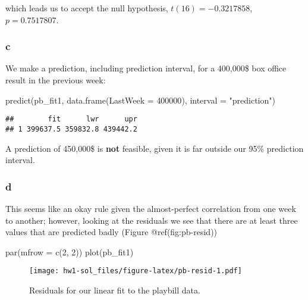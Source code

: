 \documentclass[
]{article}
\newenvironment{Shaded}{\begin{snugshade}}{\end{snugshade}}
\newcommand{\AttributeTok}[1]{\textcolor[rgb]{0.77,0.63,0.00}{#1}}
\newcommand{\DecValTok}[1]{\textcolor[rgb]{0.00,0.00,0.81}{#1}}
\newcommand{\FunctionTok}[1]{\textcolor[rgb]{0.00,0.00,0.00}{#1}}
\newcommand{\NormalTok}[1]{#1}
\newcommand{\StringTok}[1]{\textcolor[rgb]{0.31,0.60,0.02}{#1}}
\begin{document}
which leads us to accept the null hypothesis, \(t(16) = -0.3217858\),
\(p = 0.7517807\).

\hypertarget{c}{%
\subsubsection*{c}\label{c}}

We make a prediction, including prediction interval, for a 400,000\$ box
office result in the previous week:

\begin{Shaded}
\begin{Highlighting}[]
\FunctionTok{predict}\NormalTok{(pb\_fit1, }\FunctionTok{data.frame}\NormalTok{(}\AttributeTok{LastWeek =} \DecValTok{400000}\NormalTok{), }\AttributeTok{interval =} \StringTok{"prediction"}\NormalTok{)}
\end{Highlighting}
\end{Shaded}

\begin{verbatim}
##        fit      lwr      upr
## 1 399637.5 359832.8 439442.2
\end{verbatim}

A prediction of 450,000\$ is \textbf{not} feasible, given it is far
outside our 95\% prediction interval.

\hypertarget{d}{%
\subsubsection*{d}\label{d}}

This seems like an okay rule given the almost-perfect correlation from
one week to another; however, looking at the residuals we see that there
are at least three values that are predicted badly (Figure
@ref(fig:pb-resid))

\begin{Shaded}
\begin{Highlighting}[]
\FunctionTok{par}\NormalTok{(}\AttributeTok{mfrow =} \FunctionTok{c}\NormalTok{(}\DecValTok{2}\NormalTok{, }\DecValTok{2}\NormalTok{))}
\FunctionTok{plot}\NormalTok{(pb\_fit1)}
\end{Highlighting}
\end{Shaded}

\begin{figure}
\centering
\texttt{[image: hw1-sol\_files/figure-latex/pb-resid-1.pdf]}
\caption{Residuals for our linear fit to the playbill data.}
\end{figure}
\end{document}
